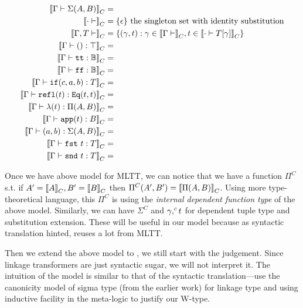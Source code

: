 \begin{align*}
  {{\llbracket {\ensuremath{ {\Gamma} \vdash {\ensuremath{\Sigma({A},{B})}} }} \rrbracket}_C} &= \\
  {{\llbracket {\ensuremath{ {\cdot} \vdash }} \rrbracket}_C} &= \{\epsilon\} \text{  the singleton set with identity substitution} \\ 
  {{\llbracket {\ensuremath{ {\Gamma, T} \vdash }} \rrbracket}_C} &= \{ (\gamma , t) : \gamma \in {{\llbracket {\ensuremath{ {\Gamma} \vdash }} \rrbracket}_C}, t \in {{\llbracket {\ensuremath{ {\cdot} \vdash {\ensuremath{{T}\!\left[{\gamma}\right]}} }} \rrbracket}_C}  \} \\
  {{\llbracket {\ensuremath{ {\Gamma} \vdash {\ensuremath{()}} : {\top} }} \rrbracket}_C} &= \\
  {{\llbracket {\ensuremath{ {\Gamma} \vdash {\ensuremath{\texttt{tt}}} : {\mathbb{B}} }} \rrbracket}_C} &= \\
  {{\llbracket {\ensuremath{ {\Gamma} \vdash {\ensuremath{\texttt{ff}}} : {\mathbb{B}} }} \rrbracket}_C} &= \\
  {{\llbracket {\ensuremath{ {\Gamma} \vdash {\ensuremath{\texttt{if}({c},{a},{b})}} : {T} }} \rrbracket}_C} &= \\
  {{\llbracket {\ensuremath{ {\Gamma} \vdash {\ensuremath{\texttt{refl}({t})}} : {\texttt{Eq}({t},{t})} }} \rrbracket}_C} &= \\
  {{\llbracket {\ensuremath{ {\Gamma} \vdash {\ensuremath{\lambda({t})}} : {\Pi({A},{B})} }} \rrbracket}_C} &= \\
  {{\llbracket {\ensuremath{ {\Gamma} \vdash {\ensuremath{\texttt{app}({t})}} : {B} }} \rrbracket}_C} &= \\
  {{\llbracket {\ensuremath{ {\Gamma} \vdash {\ensuremath{({a},{b})}} : {\Sigma({A},{B})} }} \rrbracket}_C} &= \\
  {{\llbracket {\ensuremath{ {\Gamma} \vdash {\ensuremath{\texttt{fst}~{t}}} : {T} }} \rrbracket}_C} &= \\
  {{\llbracket {\ensuremath{ {\Gamma} \vdash {\ensuremath{\texttt{snd}~{t}}} : {T} }} \rrbracket}_C} &= \\
\end{align*}

\newcommand{\Glued}[1]{\ensuremath{{#1}^C}}
\newcommand{\GSubstExt}[2]{\ensuremath{{#1},^c{#2}}}


Once we have above model for MLTT, we can notice that we have a function $\Glued{\Pi}$ s.t. if $A' = {{\llbracket {A} \rrbracket}_C}, B' = {{\llbracket {B} \rrbracket}_C}$ then $\Glued{\Pi}(A', B') = \denotesC{\TyPi{A}{B}}$. Using more type-theoretical language, this $\Glued{\Pi}$ is using the \emph{internal dependent function type} of the above model. Similarly, we can have $\Glued{\Sigma}$ and $\GSubstExt{\gm}{t}$ for dependent tuple type and substitution extension. These will be useful in our \TT model because as syntactic translation hinted, \TT reuses a lot from MLTT.

Then we extend the above model to \TT , we still start with the judgement. Since linkage transformers are just syntactic sugar, we will not interpret it.
The intuition of the model is similar to that of the syntactic translation---use the canonicity model of sigma type (from the earlier work) for linkage type and using inductive facility in the meta-logic to justify our W-type. 

